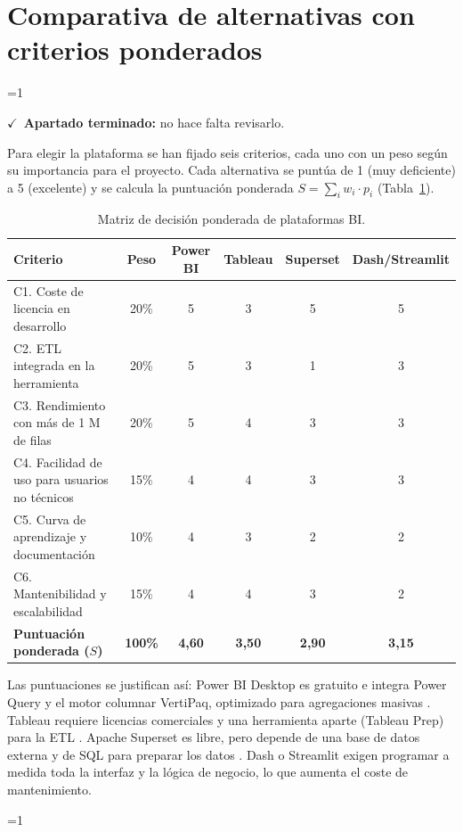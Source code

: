 \documentclass[12pt, a4paper, oneside]{report}
\newcommand{\mostrarterminados}{1}
\newenvironment{revisado}
  {\ifnum\mostrarterminados=1\relax\begin{cajarevisada}\noindent\colorbox{verdeterminado}{\parbox{\dimexpr\linewidth-2\fboxsep\relax}{\small$\checkmark$\ \textbf{Apartado terminado:} no hace falta revisarlo.}}\par\medskip\fi}
  {\ifnum\mostrarterminados=1\relax\end{cajarevisada}\fi}
\begin{document}
\section{Comparativa de alternativas con criterios ponderados}
\begin{revisado}
Para elegir la plataforma se han fijado seis criterios, cada uno con un peso según su importancia para el proyecto. Cada alternativa se puntúa de 1 (muy deficiente) a 5 (excelente) y se calcula la puntuación ponderada $S = \sum_i w_i \cdot p_i$ (Tabla~\ref{tab:matriz_decision}).

\begin{table}[H]
\centering
\small
\renewcommand{\arraystretch}{1.1}
\setlength{\tabcolsep}{4pt}
\begin{tabularx}{\textwidth}{@{} X c c c c c @{}}
\toprule
\textbf{Criterio} & \textbf{Peso} & \textbf{Power BI} & \textbf{Tableau} & \textbf{Superset} & \textbf{Dash/Streamlit} \\ \midrule
C1. Coste de licencia en desarrollo & 20\% & 5 & 3 & 5 & 5 \\
C2. ETL integrada en la herramienta & 20\% & 5 & 3 & 1 & 3 \\
C3. Rendimiento con más de 1 M de filas & 20\% & 5 & 4 & 3 & 3 \\
C4. Facilidad de uso para usuarios no técnicos & 15\% & 4 & 4 & 3 & 3 \\
C5. Curva de aprendizaje y documentación & 10\% & 4 & 3 & 2 & 2 \\
C6. Mantenibilidad y escalabilidad & 15\% & 4 & 4 & 3 & 2 \\ \midrule
\textbf{Puntuación ponderada ($S$)} & \textbf{100\%} & \textbf{4,60} & \textbf{3,50} & \textbf{2,90} & \textbf{3,15} \\ \bottomrule
\end{tabularx}
\caption{Matriz de decisión ponderada de plataformas BI.}
\label{tab:matriz_decision}
\end{table}

Las puntuaciones se justifican así: Power BI Desktop es gratuito \cite{ms_powerbi_pricing} e integra Power Query y el motor columnar VertiPaq, optimizado para agregaciones masivas \cite{ferrari2019definitive}. Tableau requiere licencias comerciales y una herramienta aparte (Tableau Prep) para la ETL \cite{tableau_pricing}. Apache Superset es libre, pero depende de una base de datos externa y de SQL para preparar los datos \cite{apache_superset}. Dash o Streamlit exigen programar a medida toda la interfaz y la lógica de negocio, lo que aumenta el coste de mantenimiento.


\end{revisado}
\end{document}

